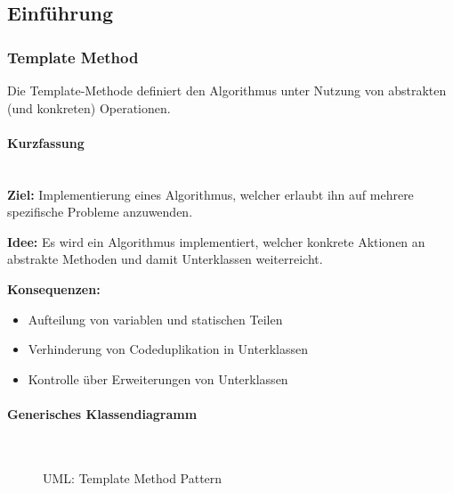 \documentclass[
    ngerman,
    color=3b,
    summary,
    boxarc,
    main,
]{rubos-tuda-template}
\begin{document}
\subsection{Einführung}


\subsubsection{Template Method}
\begin{definition}
    Die Template-Methode definiert den Algorithmus unter Nutzung von abstrakten (und konkreten) Operationen.
\end{definition}
\paragraph{Kurzfassung}\mbox{}\\
\textbf{Ziel:} Implementierung eines Algorithmus, welcher erlaubt ihn auf mehrere spezifische Probleme anzuwenden.

\textbf{Idee:} Es wird ein Algorithmus implementiert, welcher konkrete Aktionen an abstrakte Methoden und damit Unterklassen weiterreicht.

\textbf{Konsequenzen:}
\begin{itemize}
    \item Aufteilung von variablen und statischen Teilen
    \item Verhinderung von Codeduplikation in Unterklassen
    \item Kontrolle über Erweiterungen von Unterklassen
\end{itemize}

\paragraph{Generisches Klassendiagramm}\mbox{}\\
\begin{figure}[ht]
    \centering
    \caption{UML: Template Method Pattern}
\end{figure}
\end{document}
